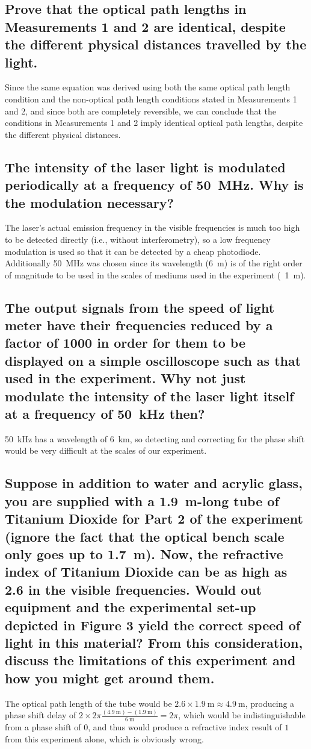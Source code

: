 \documentclass[a4paper]{scrartcl}
\begin{document}
\subsection{Prove that the optical path lengths in Measurements 1 and 2 are identical, despite the different physical distances travelled by the light.}
Since the same equation was derived using both the same optical path length condition and the non-optical path length conditions stated in Measurements 1 and 2, and since both are completely reversible, we can conclude that the conditions in Measurements 1 and 2 imply identical optical path lengths, despite the different physical distances.

\subsection{The intensity of the laser light is modulated periodically at a frequency of \SI{50}{\mega\hertz}. Why is the modulation necessary?}
The laser's actual emission frequency in the visible frequencies is much too high to be detected directly (i.e., without interferometry), so a low frequency modulation is used so that it can be detected by a cheap photodiode. Additionally \SI{50}{\mega\hertz} was chosen since its wavelength (\SI{6}{\metre}) is of the right order of magnitude to be used in the scales of mediums used in the experiment (~\SI{1}{\metre}).

\subsection{The output signals from the speed of light meter have their frequencies reduced by a factor of 1000 in order for them to be displayed on a simple oscilloscope such as that used in the experiment. Why not just modulate the intensity of the laser light itself at a frequency of \SI{50}{\kilo\hertz} then?}
\SI{50}{\kilo\hertz} has a wavelength of \SI{6}{\kilo\metre}, so detecting and correcting for the phase shift would be very difficult at the scales of our experiment.

\subsection{Suppose in addition to water and acrylic glass, you are supplied with a \SI{1.9}{\meter}-long tube of Titanium Dioxide for Part 2 of the experiment (ignore the fact that the optical bench scale only goes up to \SI{1.7}{\meter}). Now, the refractive index of Titanium Dioxide can be as high as \SI{2.6}{} in the visible frequencies. Would out equipment and the experimental set-up depicted in Figure 3 yield the correct speed of light in this material? From this consideration, discuss the limitations of this experiment and how you might get around them.}
The optical path length of the tube would be \(2.6 \times \SI{1.9}{\meter} \approx \SI{4.9}{\metre}\), producing a phase shift delay of \(2 \times 2 \pi \frac{(\SI{4.9}{\metre}) - (\SI{1.9}{\metre})}{\SI{6}{\metre}} = 2 \pi\), which would be indistinguishable from a phase shift of \(0\), and thus would produce a refractive index result of \(1\) from this experiment alone, which is obviously wrong.
\end{document}

